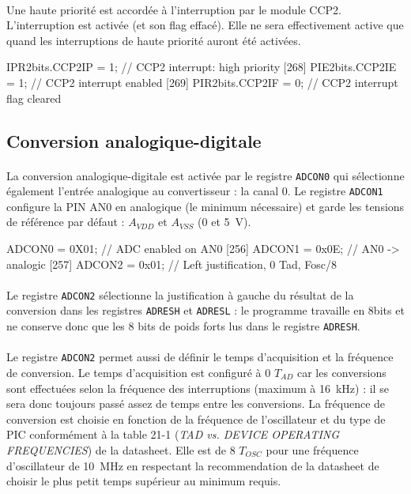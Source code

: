 \documentclass{article}
\begin{document}
    \paragraph{}
    Une haute priorité est accordée à l'interruption par le module CCP2. L'interruption est activée (et son flag effacé). Elle ne sera effectivement active que quand les interruptions de haute priorité auront été activées.
    \begin{verbatimtab}
    [267]    IPR2bits.CCP2IP = 1;    // CCP2 interrupt: high priority
    [268]    PIE2bits.CCP2IE = 1;    // CCP2 interrupt enabled
    [269]    PIR2bits.CCP2IF = 0;    // CCP2 interrupt flag cleared
    \end{verbatimtab}

    \subsection{Conversion analogique-digitale}
    \paragraph{}
    La conversion analogique-digitale est activée par le registre \texttt{ADCON0} qui sélectionne également l'entrée analogique au convertisseur : la canal 0. Le registre \texttt{ADCON1} configure la PIN AN0 en analogique (le minimum nécessaire) et garde les tensions de référence par défaut : $A_{VDD}$ et $A_{VSS}$ (0 et \SI{5}{\volt}).
    \begin{verbatimtab}
    [255]    ADCON0  = 0X01;         // ADC enabled on AN0
    [256]    ADCON1  = 0x0E;         // AN0 -> analogic
    [257]    ADCON2  = 0x01;         // Left justification, 0 Tad, Fosc/8
    \end{verbatimtab}

    \paragraph{}
    Le registre \texttt{ADCON2} sélectionne la justification à gauche du résultat de la conversion dans les registres \texttt{ADRESH} et \texttt{ADRESL} : le programme travaille en 8bits et ne conserve donc que les 8 bits de poids forts lus dans le registre \texttt{ADRESH}.

    \paragraph{}
    Le registre \texttt{ADCON2} permet aussi de définir le temps d'acquisition et la fréquence de conversion. Le temps d'acquisition est configuré à 0 $T_{AD}$ car les conversions sont effectuées selon la fréquence des interruptions (maximum à \SI{16}{\kilo\hertz}) : il se sera donc toujours passé assez de temps entre les conversions. La fréquence de conversion est choisie en fonction de la fréquence de l'oscillateur et du type de PIC conformément à la table 21-1 (\emph{TAD vs. DEVICE OPERATING FREQUENCIES}) de la datasheet. Elle est de 8 $T_{OSC}$ pour une fréquence d'oscillateur de \SI{10}{\mega\hertz} en respectant la recommendation de la datasheet de choisir le plus petit temps supérieur au minimum requis.
\end{document}
